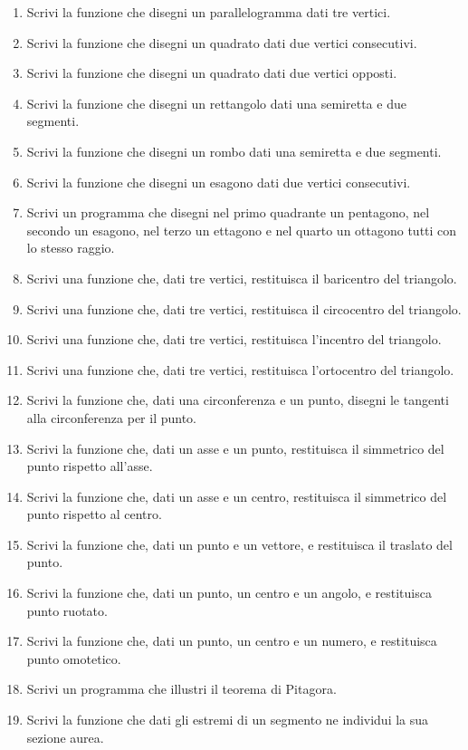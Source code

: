 \begin{enumerate} [noitemsep]
\item Scrivi la funzione che disegni un parallelogramma dati tre vertici.
\item Scrivi la funzione che disegni un quadrato dati due vertici consecutivi.
\item Scrivi la funzione che disegni un quadrato dati due vertici opposti.
\item Scrivi la funzione che disegni un rettangolo dati una semiretta e due 
segmenti.
\item Scrivi la funzione che disegni un rombo dati una semiretta e due 
segmenti.
\item Scrivi la funzione che disegni un esagono dati due vertici consecutivi.
\item Scrivi un programma che disegni nel primo quadrante un pentagono, nel 
secondo un esagono, nel terzo un ettagono e nel quarto un ottagono tutti con lo 
stesso raggio.
\item Scrivi una funzione che, dati tre vertici, restituisca il baricentro del 
triangolo.
\item Scrivi una funzione che, dati tre vertici, restituisca il circocentro del 
triangolo.
\item Scrivi una funzione che, dati tre vertici, restituisca l'incentro del 
triangolo.
\item Scrivi una funzione che, dati tre vertici, restituisca l'ortocentro del 
triangolo.
\item Scrivi la funzione che, dati una circonferenza e un punto, disegni le 
tangenti alla circonferenza per il punto.
\item Scrivi la funzione che, dati un asse e un punto, restituisca il 
simmetrico del punto rispetto all'asse.
\item Scrivi la funzione che, dati un asse e un centro, restituisca il 
simmetrico del punto rispetto al centro.
\item Scrivi la funzione che, dati un punto e un vettore, e restituisca 
il traslato del punto.
\item Scrivi la funzione che, dati un punto, un centro e un angolo,  
e restituisca punto ruotato.
\item Scrivi la funzione che, dati un punto, un centro e un numero,  
e restituisca punto omotetico.
\item Scrivi un programma che illustri il teorema di Pitagora.
\item Scrivi la funzione che dati gli estremi di un segmento ne individui la 
sua sezione aurea.
\end{enumerate}
